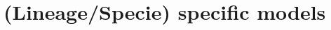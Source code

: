 \documentclass[10pt]{beamer}
\begin{document}

 \section{ (Lineage/Specie) specific models}
\end{document}

